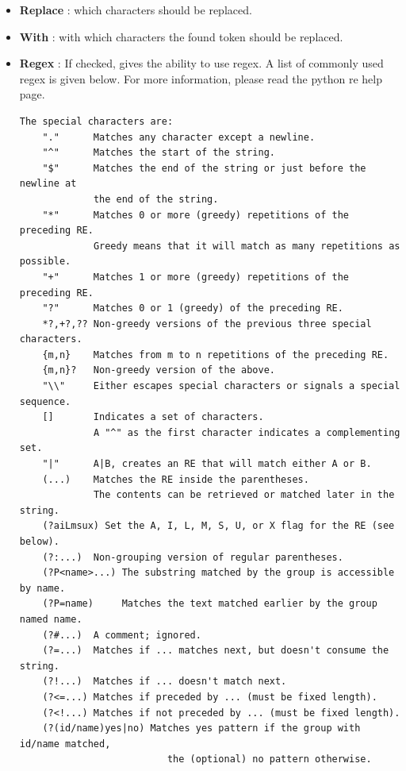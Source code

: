 \documentclass[10pt, a4paper]{scrartcl}
\begin{document}
\begin{itemize}
        \item \textbf{Replace} : which characters should be replaced.
        \item \textbf{With} : with which characters the found token should be replaced.
        \item \textbf{Regex} : If checked, gives the ability to use regex. A list of commonly used regex is given below. For more information, please read the python re help page.
                \begingroup
                \fontsize{8pt}{8pt}\selectfont
\begin{verbatim}
The special characters are:
    "."      Matches any character except a newline.
    "^"      Matches the start of the string.
    "$"      Matches the end of the string or just before the newline at
             the end of the string.
    "*"      Matches 0 or more (greedy) repetitions of the preceding RE.
             Greedy means that it will match as many repetitions as possible.
    "+"      Matches 1 or more (greedy) repetitions of the preceding RE.
    "?"      Matches 0 or 1 (greedy) of the preceding RE.
    *?,+?,?? Non-greedy versions of the previous three special characters.
    {m,n}    Matches from m to n repetitions of the preceding RE.
    {m,n}?   Non-greedy version of the above.
    "\\"     Either escapes special characters or signals a special sequence.
    []       Indicates a set of characters.
             A "^" as the first character indicates a complementing set.
    "|"      A|B, creates an RE that will match either A or B.
    (...)    Matches the RE inside the parentheses.
             The contents can be retrieved or matched later in the string.
    (?aiLmsux) Set the A, I, L, M, S, U, or X flag for the RE (see below).
    (?:...)  Non-grouping version of regular parentheses.
    (?P<name>...) The substring matched by the group is accessible by name.
    (?P=name)     Matches the text matched earlier by the group named name.
    (?#...)  A comment; ignored.
    (?=...)  Matches if ... matches next, but doesn't consume the string.
    (?!...)  Matches if ... doesn't match next.
    (?<=...) Matches if preceded by ... (must be fixed length).
    (?<!...) Matches if not preceded by ... (must be fixed length).
    (?(id/name)yes|no) Matches yes pattern if the group with id/name matched,
                          the (optional) no pattern otherwise.


\end{verbatim}
\end{itemize}
\end{document}
